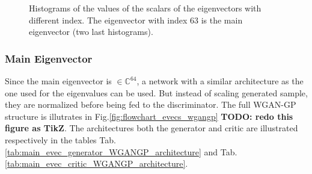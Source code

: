 \documentclass[11pt,a4paper,twoside]{report}
\begin{document}
\begin{figure}
    \centering
    \caption{Histograms of the values of the scalars of the eigenvectors with different index. The eigenvector with index $63$ is the main eigenvector (two last histograms).}
    \label{fig:histograms_eigenvectors}
\end{figure}

\subsubsection{Main Eigenvector}

Since the main eigenvector is $\in \mathbb{C}^{64}$, a network with a similar architecture as the one used for the eigenvalues can be used. But instead of scaling generated sample, they are normalized before being fed to the discriminator. The full WGAN-GP structure is illutrates in Fig.\ref{fig:flowchart_evecs_wgangp} \textbf{TODO: redo this figure as TikZ}. The architectures both the generator and critic are illustrated respectively in the tables Tab.\ref{tab:main_evec_generator_WGANGP_architecture} and Tab.\ref{tab:main_evec_critic_WGANGP_architecture}.
\end{document}
